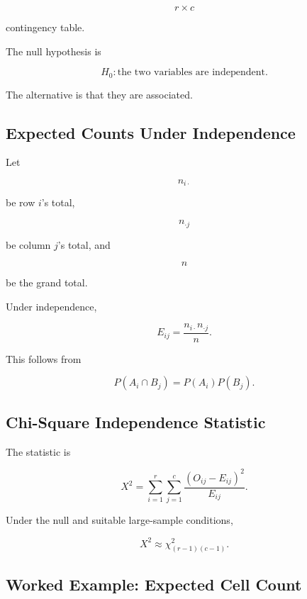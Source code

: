 \[
r\times c
\]

contingency table.

The null hypothesis is

\[
\boxed{
H_0:
\text{the two variables are independent}.
}
\]

The alternative is that they are associated.

\subsection{Expected Counts Under Independence}
\label{subsec:expected-counts-independence}

Let

\[
n_{i\cdot}
\]

be row \(i\)'s total,

\[
n_{\cdot j}
\]

be column \(j\)'s total, and

\[
n
\]

be the grand total.

Under independence,

\[
\boxed{
E_{ij}
=
\frac{
n_{i\cdot}
n_{\cdot j}
}{
n
}.
}
\]

This follows from

\[
P(A_i\cap B_j)
=
P(A_i)P(B_j).
\]

\subsection{Chi-Square Independence Statistic}
\label{subsec:chi-square-independence-statistic}

The statistic is

\[
\boxed{
X^2
=
\sum_{i=1}^{r}
\sum_{j=1}^{c}
\frac{
(O_{ij}-E_{ij})^2
}{
E_{ij}
}.
}
\]

Under the null and suitable large-sample conditions,

\[
\boxed{
X^2
\approx
\chi^2_{(r-1)(c-1)}.
}
\]

\subsection{Worked Example: Expected Cell Count}
\label{subsec:worked-expected-cell-count}

